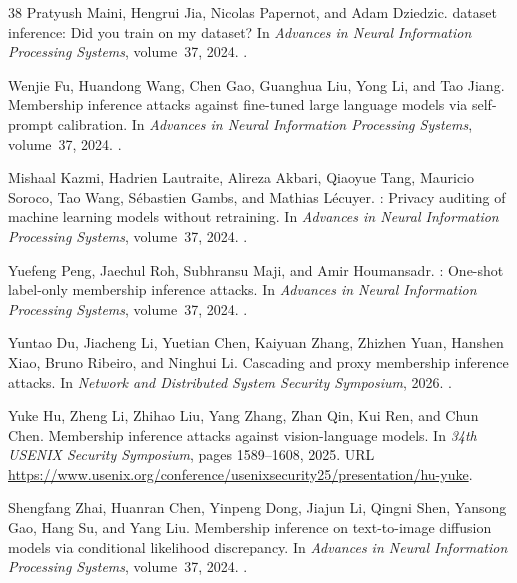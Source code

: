 \begin{thebibliography}{38}
Pratyush Maini, Hengrui Jia, Nicolas Papernot, and Adam Dziedzic.
 dataset inference: Did you train on my dataset?
\newblock In \emph{Advances in Neural Information Processing Systems},
  volume~37, 2024.
\newblock {}.

Wenjie Fu, Huandong Wang, Chen Gao, Guanghua Liu, Yong Li, and Tao Jiang.
\newblock Membership inference attacks against fine-tuned large language models
  via self-pro{}mpt calibration.
\newblock In \emph{Advances in Neural Information Processing Systems},
  volume~37, 2024.
\newblock {}.

Mishaal Kazmi, Hadrien Lautraite, Alireza Akbari, Qiaoyue Tang, Mauricio
  Soroco, Tao Wang, S{\'e}bastien Gambs, and Mathias L{\'e}cuyer.
: Privacy auditing of machine learning models without
  retraining.
\newblock In \emph{Advances in Neural Information Processing Systems},
  volume~37, 2024.
\newblock {}.

Yuefeng Peng, Jaechul Roh, Subhransu Maji, and Amir Houmansadr.
: One-shot label-only membership inference attacks.
\newblock In \emph{Advances in Neural Information Processing Systems},
  volume~37, 2024.
\newblock {}.

Yuntao Du, Jiacheng Li, Yuetian Chen, Kaiyuan Zhang, Zhizhen Yuan, Hanshen
  Xiao, Bruno Ribeiro, and Ninghui Li.
\newblock Cascading and proxy membership inference attacks.
\newblock In \emph{Network and Distributed System Security Symposium}, 2026.
\newblock {}.

Yuke Hu, Zheng Li, Zhihao Liu, Yang Zhang, Zhan Qin, Kui Ren, and Chun Chen.
\newblock Membership inference attacks against vision-language models.
\newblock In \emph{34th USENIX Security Symposium}, pages 1589--1608, 2025.
\newblock URL
  \url{https://www.usenix.org/conference/usenixsecurity25/presentation/hu-yuke}.

Shengfang Zhai, Huanran Chen, Yinpeng Dong, Jiajun Li, Qingni Shen, Yansong
  Gao, Hang Su, and Yang Liu.
\newblock Membership inference on text-to-image diffusion models via
  conditional likelihood discrepancy.
\newblock In \emph{Advances in Neural Information Processing Systems},
  volume~37, 2024.
\newblock {}.


\end{thebibliography}

